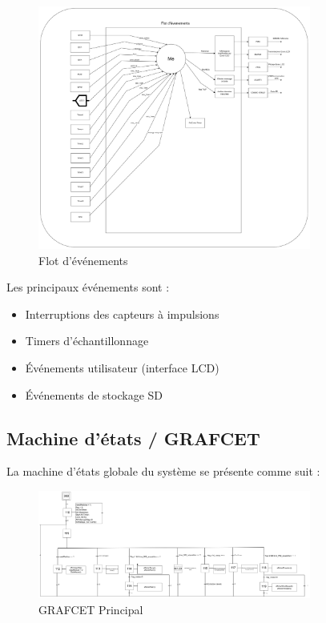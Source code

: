 \documentclass[12pt]{article}
\begin{document}
\begin{figure}[H]
    \capstart
    \centering
    \includegraphics[width=0.8\textwidth]{./images/flot_evenements.png}
    \caption{Flot d'événements}
    \label{fig:flot_d_evenements}
\end{figure}

Les principaux événements sont :
\begin{itemize}
    \item Interruptions des capteurs à impulsions
    \item Timers d'échantillonnage
    \item Événements utilisateur (interface LCD)
    \item Événements de stockage SD
\end{itemize}

\subsection{Machine d'états / GRAFCET}
La machine d'états globale du système se présente comme suit :

\begin{figure}[H]
    \capstart
    \centering
    \includegraphics[width=0.8\textwidth]{./images/grafcetfinal.png}
    \caption{GRAFCET Principal}
    \label{fig:grafcet_principal}
\end{figure}
\end{document}
